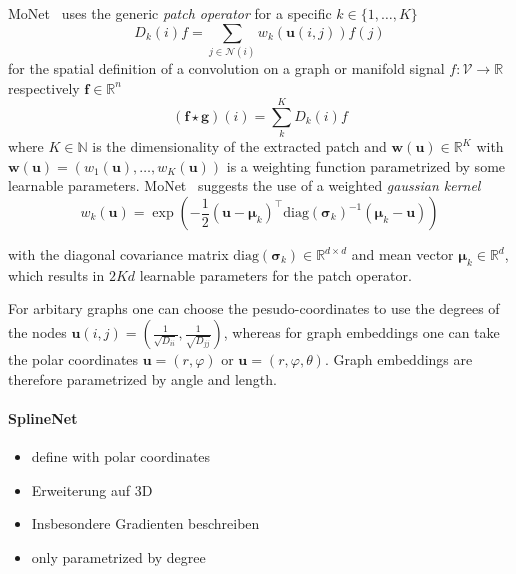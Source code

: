 \documentclass[pdftex,10pt,a4paper]{scrartcl}
\begin{document}
MoNet~\cite{Monti2016} uses the generic \emph{patch operator} for a specific $k \in \{ 1, \ldots, K \}$
\begin{equation*}
  D_k(i)f = \sum_{j \in \mathcal{N}(i)} w_k(\mathbf{u}(i, j)) f(j)
\end{equation*}
for the spatial definition of a convolution on a graph or manifold signal $f \colon \mathcal{V} \to \mathbb{R}$ respectively $\mathbf{f} \in \mathbb{R}^n$
\begin{equation*}
  (\mathbf{f} \star \mathbf{g})(i) = \sum_k^K D_k(i)f
\end{equation*}
where $K \in \mathbb{N}$ is the dimensionality of the extracted patch and $\mathbf{w}(\mathbf{u}) \in \mathbb{R}^K$ with $\mathbf{w}(\mathbf{u}) = (w_1(\mathbf{u}), \ldots, w_K(\mathbf{u}))$ is a weighting function parametrized by some learnable parameters.
MoNet~\cite{Monti2016} suggests the use of a weighted \emph{gaussian kernel}
\begin{equation*}
  w_k(\mathbf{u}) = \exp \left(-\frac{1}{2} {(\mathbf{u} - \mathbf{\mu}_k)}^{\top} {\mathrm{diag}(\mathbf{\sigma}_k)}^{-1} (\mathbf{\mu}_k - \mathbf{u}) \right)
\end{equation*}

with the diagonal covariance matrix $\mathrm{diag}(\mathbf{\sigma}_k) \in \mathbb{R}^{d \times d}$ and mean vector $\mathbf{\mu}_k \in \mathbb{R}^d$, which results in $2Kd$ learnable parameters for the patch operator.

For arbitary graphs one can choose the pesudo-coordinates to use the degrees of the nodes $\mathbf{u}(i,j) = \left( \tfrac{1}{\sqrt{D_{ii}}}, \tfrac{1}{\sqrt{D_{jj}}} \right)$, whereas for graph embeddings one can take the polar coordinates $\mathbf{u} = (r, \varphi)$ or $\mathbf{u} = (r, \varphi, \theta)$.
Graph embeddings are therefore parametrized by angle and length.

\paragraph{SplineNet}





\begin{itemize}
  \item define with polar coordinates
  \item Erweiterung auf 3D
  \item Insbesondere Gradienten beschreiben
\end{itemize}

\begin{itemize}
  \item only parametrized by degree
\end{itemize}



\end{document}
